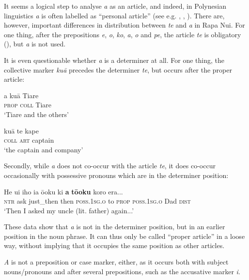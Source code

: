 It seems a logical step to analyse \textit{a} as an article, and indeed, in Polynesian linguistics \textit{a} is often labelled as “personal article” (see e.g. \citealt[58]{Clark1976}, \citealt[109]{Bauer1993}, \citealt[62]{Cablitz2006}). There are, however, important differences in distribution between \textit{te} and \textit{a} in Rapa Nui. For one thing, after the prepositions \textit{e}, \textit{o}, \textit{ko}, \textit{a}, \textit{o} and \textit{pe}, the article \textit{te} is obligatory (), but \textit{a} is not used.

It is even questionable whether \textit{a} is a determiner at all. For one thing, the collective marker \textit{kuā} precedes the determiner \textit{te}, but occurs after the proper article:

\ea\label{ex:5.196}
\gll a kuā Tiare \\
\textsc{prop} \textsc{coll} Tiare \\

\glt 
‘Tiare and the others’ \textstyleExampleref{[R315.227]} 
\z

\ea\label{ex:5.197}
\gll kuā te kape \\
\textsc{coll} \textsc{art} captain \\

\glt
‘the captain and company’ \textstyleExampleref{[R416.864]} 
\z

Secondly, while \textit{a} does not co-occur with the article \textit{te}, it does co-occur occasionally with possessive pronouns which are in the determiner position:

\ea\label{ex:5.198}
\gll He {\ꞌ}ui iho ia ō{\ꞌ}oku ki \textbf{a} \textbf{tō{\ꞌ}oku} koro era... \\
\textsc{ntr} ask just\_then then \textsc{poss.1sg.o} to \textsc{prop} \textsc{poss.1sg.o} Dad \textsc{dist} \\

\glt
‘Then I asked my uncle (lit. father) again...’ \textstyleExampleref{[R230.121]} 
\z

These data show that \textit{a} is not in the determiner position, but in an earlier position in the noun phrase. It can thus only be called “proper article” in a loose way, without implying that it occupies the same position as other articles.

\textit{A} is not a preposition or case marker, either, as it occurs both with subject nouns/pro\-nouns and after several prepositions, such as the accusative marker \textit{i}.
